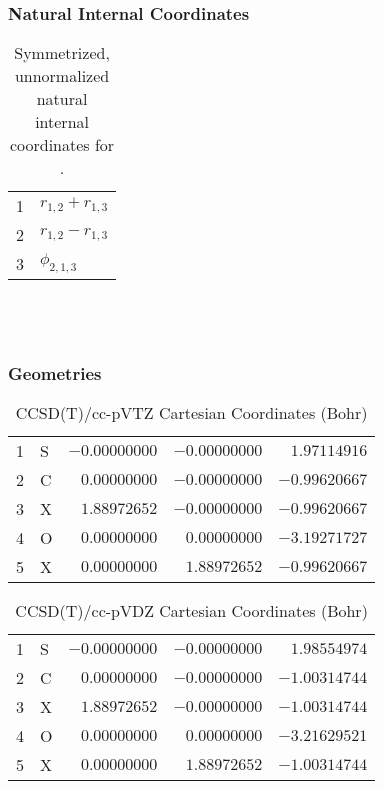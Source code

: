 \documentclass[10pt,oneside]{article}
\begin{document}
\clearpage

\subsubsection*{Natural Internal Coordinates}
\begin{table}[h!]
\centering
\caption{Symmetrized, unnormalized natural internal coordinates for .}
\small
\begin{tabular}{ll}
  1   & $r_{1,2} + r_{1,3}$ \\
  2   & $r_{1,2} - r_{1,3}$ \\
  3   & $\phi_{2,1,3}$ \\
\end{tabular}
\end{table}

\clearpage

\subsection{\ \ \ }

\subsubsection*{Geometries}
\begin{table}[h!]
\centering
\caption{CCSD(T)/cc-pVTZ Cartesian Coordinates (Bohr)}
\begin{tabular}{llrrr}
1  & S  & $-0.00000000$ & $-0.00000000$ & $ 1.97114916$ \\
2  & C  & $ 0.00000000$ & $-0.00000000$ & $-0.99620667$ \\
3  & X  & $ 1.88972652$ & $-0.00000000$ & $-0.99620667$ \\
4  & O  & $ 0.00000000$ & $ 0.00000000$ & $-3.19271727$ \\
5  & X  & $ 0.00000000$ & $ 1.88972652$ & $-0.99620667$ \\
\end{tabular}
\end{table}

\begin{table}[h!]
\centering
\caption{CCSD(T)/cc-pVDZ Cartesian Coordinates (Bohr)}
\begin{tabular}{llrrr}
1  & S  & $-0.00000000$ & $-0.00000000$ & $ 1.98554974$ \\
2  & C  & $ 0.00000000$ & $-0.00000000$ & $-1.00314744$ \\
3  & X  & $ 1.88972652$ & $-0.00000000$ & $-1.00314744$ \\
4  & O  & $ 0.00000000$ & $ 0.00000000$ & $-3.21629521$ \\
5  & X  & $ 0.00000000$ & $ 1.88972652$ & $-1.00314744$ \\
\end{tabular}
\end{table}
\end{document}
